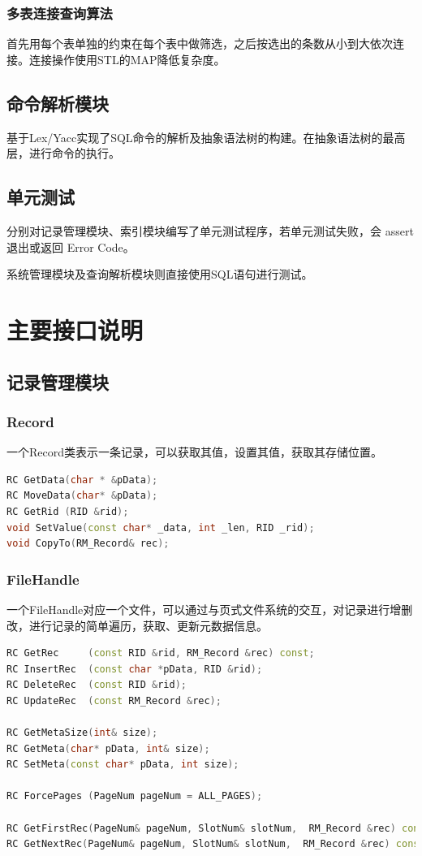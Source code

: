 \documentclass{article}
\begin{document}
\subsubsection{多表连接查询算法}
首先用每个表单独的约束在每个表中做筛选，之后按选出的条数从小到大依次连接。连接操作使用STL的MAP降低复杂度。


\subsection{命令解析模块}
基于Lex/Yacc实现了SQL命令的解析及抽象语法树的构建。在抽象语法树的最高层，进行命令的执行。

\subsection{单元测试}
分别对记录管理模块、索引模块编写了单元测试程序，若单元测试失败，会 assert 退出或返回 Error Code。

系统管理模块及查询解析模块则直接使用SQL语句进行测试。

\section{主要接口说明}
\subsection{记录管理模块}
\subsubsection{Record}
一个Record类表示一条记录，可以获取其值，设置其值，获取其存储位置。
\begin{lstlisting}[language=C++]
RC GetData(char * &pData);
RC MoveData(char* &pData);
RC GetRid (RID &rid); 
void SetValue(const char* _data, int _len, RID _rid);
void CopyTo(RM_Record& rec);
\end{lstlisting}
\subsubsection{FileHandle}
一个FileHandle对应一个文件，可以通过与页式文件系统的交互，对记录进行增删改，进行记录的简单遍历，获取、更新元数据信息。
\begin{lstlisting}[language=C++]
RC GetRec     (const RID &rid, RM_Record &rec) const;
RC InsertRec  (const char *pData, RID &rid);
RC DeleteRec  (const RID &rid);
RC UpdateRec  (const RM_Record &rec);

RC GetMetaSize(int& size);
RC GetMeta(char* pData, int& size);
RC SetMeta(const char* pData, int size);

RC ForcePages (PageNum pageNum = ALL_PAGES);

RC GetFirstRec(PageNum& pageNum, SlotNum& slotNum,  RM_Record &rec) const;
RC GetNextRec(PageNum& pageNum, SlotNum& slotNum,  RM_Record &rec) const;
\end{lstlisting}
\end{document}
